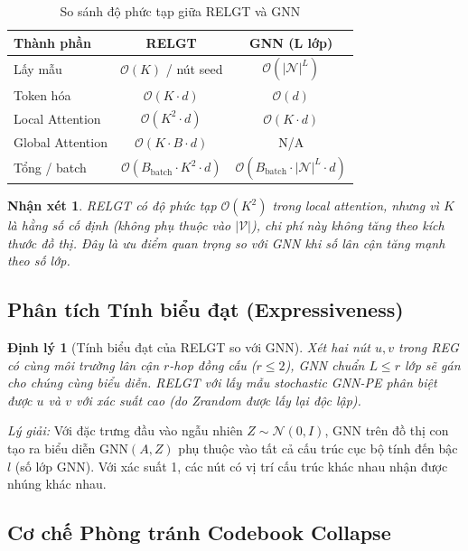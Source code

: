 \documentclass[12pt,a4paper]{article}
\newtheorem{theorem}{Định lý}
\newtheorem{remark}{Nhận xét}
\begin{document}
\begin{table}[h!]
\centering
\caption{So sánh độ phức tạp giữa RELGT và GNN}
\begin{tabular}{lcc}
\toprule
\textbf{Thành phần} & \textbf{RELGT} & \textbf{GNN (L lớp)} \\
\midrule
Lấy mẫu & $\mathcal{O}(K)$ / nút seed & $\mathcal{O}(|\mathcal{N}|^L)$ \\
Token hóa & $\mathcal{O}(K \cdot d)$ & $\mathcal{O}(d)$ \\
Local Attention & $\mathcal{O}(K^2 \cdot d)$ & $\mathcal{O}(K \cdot d)$ \\
Global Attention & $\mathcal{O}(K \cdot B \cdot d)$ & N/A \\
Tổng / batch & $\mathcal{O}(B_\text{batch} \cdot K^2 \cdot d)$ & $\mathcal{O}(B_\text{batch} \cdot |\mathcal{N}|^L \cdot d)$ \\
\bottomrule
\end{tabular}
\end{table}

\begin{remark}
RELGT có độ phức tạp $\mathcal{O}(K^2)$ trong local attention, nhưng vì $K$ 
là hằng số cố định (không phụ thuộc vào $|\mathcal{V}|$), chi phí này không 
tăng theo kích thước đồ thị. Đây là ưu điểm quan trọng so với GNN khi số 
lân cận tăng mạnh theo số lớp.
\end{remark}

\subsection{Phân tích Tính biểu đạt (Expressiveness)}

\begin{theorem}[Tính biểu đạt của RELGT so với GNN]
Xét hai nút $u, v$ trong REG có cùng môi trường lân cận $r$-hop đồng cấu 
($r \le 2$), GNN chuẩn $L \le r$ lớp sẽ gán cho chúng cùng biểu diễn.
RELGT với lấy mẫu stochastic GNN-PE phân biệt được $u$ và $v$ với xác suất 
cao (do Zrandom được lấy lại độc lập).
\end{theorem}

\textit{Lý giải:} Với đặc trưng đầu vào ngẫu nhiên $Z \sim \mathcal{N}(0, I)$,
GNN trên đồ thị con tạo ra biểu diễn $\text{GNN}(A, Z)$ phụ thuộc vào tất cả
cấu trúc cục bộ tính đến bậc $l$ (số lớp GNN). Với xác suất 1, các nút có
vị trí cấu trúc khác nhau nhận được nhúng khác nhau.

\subsection{Cơ chế Phòng tránh Codebook Collapse}
\end{document}
